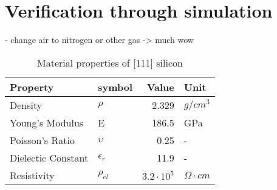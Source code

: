 \section{Verification through simulation}
\label{sec:verification}
- change air to nitrogen or other gas -> much wow

\begin{table}
	\centering
	\begin{tabular}{ l l r l } 
		\toprule
		Property & symbol & Value & Unit \\
		\midrule
		Density & $\rho$ & 2.329 & $g/cm^3$ \\
		Young's Modulus & E & 186.5 & GPa \\ 
		Poisson's Ratio & $\upsilon$ & 0.25 & - \\ 
		Dielectic Constant & $\epsilon_r$ & 11.9 & - \\
		Resistivity & $\rho_{el}$ & $3.2\cdot10^5 $ & $\Omega \cdot cm$ \\
		\bottomrule
	\end{tabular}
	\caption{Material properties of [111] silicon}
	\label{tab:silicium_mat}
\end{table}
